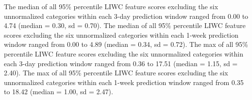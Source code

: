\documentclass[
  letterpaper,
  DIV=11,
  numbers=noendperiod]{scrartcl}
\begin{document}
The median of all 95\% percentile LIWC feature scores excluding the six
unnormalized categories within each 3-day prediction window ranged from
0.00 to 4.74 (median = 0.30, sd = 0.70). The median of all 95\%
percentile LIWC feature scores excluding the six unnormalized categories
within each 1-week prediction window ranged from 0.00 to 4.89 (median =
0.34, sd = 0.72). The max of all 95\% percentile LIWC feature scores
excluding the six unnormalized categories within each 3-day prediction
window ranged from 0.36 to 17.51 (median = 1.15, sd = 2.40). The max of
all 95\% percentile LIWC feature scores excluding the six unnormalized
categories within each 1-week prediction window ranged from 0.35 to
18.42 (median = 1.00, sd = 2.47).

\begin{table}

\begin{minipage}{\linewidth}



\end{minipage}%
\newline
\begin{minipage}{\linewidth}


\end{minipage}
\end{table}
\end{document}
